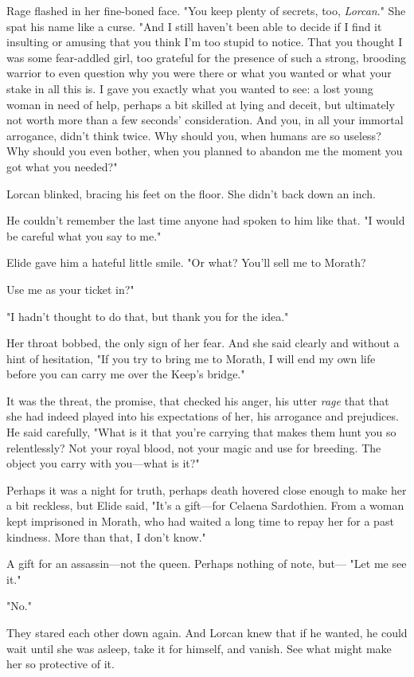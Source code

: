 Rage flashed in her fine-boned face. "You keep plenty of secrets, too,
\emph{Lorcan}." She spat his name like a curse. "And I still haven't been able to decide if I find it insulting or amusing that you think I'm too stupid to notice. That you thought I was some fear-addled girl, too grateful for the presence of such a strong, brooding warrior to even question why you were there or what you wanted or what your stake in all this is. I gave you exactly what you wanted to see: a lost young woman in need of help, perhaps a bit skilled at lying and deceit, but ultimately not worth more than a few seconds' consideration. And you, in all your immortal arrogance, didn't think twice. Why should you, when humans are so useless? Why should you even bother, when you planned to abandon me the moment you got what you needed?"

Lorcan blinked, bracing his feet on the floor. She didn't back down an inch.

He couldn't remember the last time anyone had spoken to him like that. "I would be careful what you say to me."

Elide gave him a hateful little smile. "Or what? You'll sell me to Morath?

Use me as your ticket in?"

"I hadn't thought to do that, but thank you for the idea."

Her throat bobbed, the only sign of her fear. And she said clearly and without a hint of hesitation, "If you try to bring me to Morath, I will end my own life before you can carry me over the Keep's bridge."

It was the threat, the promise, that checked his anger, his utter
\emph{rage} that  that she had indeed played into his expectations of her, his arrogance and prejudices. He said carefully, "What is it that you're carrying that makes them hunt you so relentlessly? Not your royal blood, not your magic and use for breeding. The object you carry with you---what is it?"

Perhaps it was a night for truth, perhaps death hovered close enough to make her a bit reckless, but Elide said, "It's a gift---for Celaena Sardothien. From a woman kept imprisoned in Morath, who had waited a long time to repay her for a past kindness. More than that, I don't know."

A gift for an assassin---not the queen. Perhaps nothing of note, but--- "Let me see it."

"No."

They stared each other down again. And Lorcan knew that if he wanted, he could wait until she was asleep, take it for himself, and vanish. See what might make her so protective of it.

